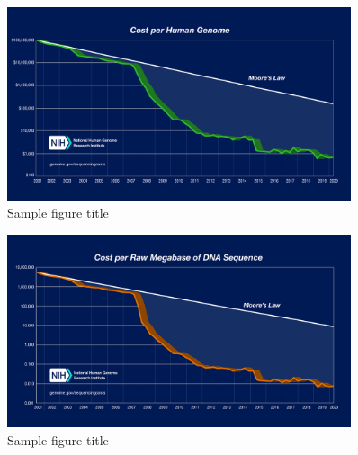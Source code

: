 \documentclass{bmcart}
\begin{document}
		
		
		\begin{figure}[h!]
			\includegraphics[width=0.9\textwidth]{figures/Sequencing_Cost_per_Genome_May2020.jpg}
			\caption{Sample figure title}
			\label{fig:cost_genome}
		\end{figure}
		
		\begin{figure}[h!]
			\includegraphics[width=0.9\textwidth]{figures/Sequencing_Cost_per_Megabase_May2020.jpg}
			\caption{Sample figure title}
			\label{fig:cost_megabase}
		\end{figure}
		
\end{document}
